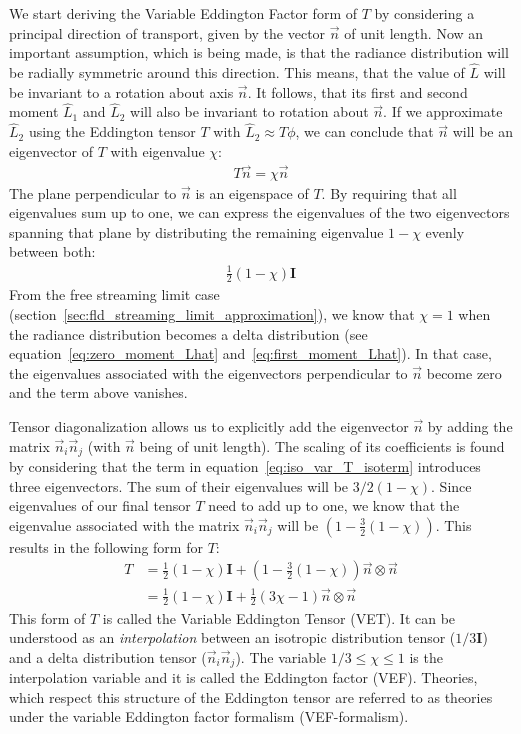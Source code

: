 We start deriving the Variable Eddington Factor form of $T$ by considering a principal direction of transport, given by the vector $\vec{n}$ of unit length. Now an important assumption, which is being made, is that the radiance distribution will be radially symmetric around this direction. This means, that the value of $\hat{L}$ will be invariant to a rotation about axis $\vec{n}$. It follows, that its first and second moment $\hat{L}_1$ and $\hat{L}_2$ will also be invariant to rotation about $\vec{n}$. If we approximate $\hat{L}_2$ using the Eddington tensor $T$ with $\hat{L}_2\approx T\phi$, we can conclude that $\vec{n}$ will be an eigenvector of $T$ with eigenvalue $\chi$:
\begin{align*}
T\vec{n} = \chi\vec{n}
\end{align*}
The plane perpendicular to $\vec{n}$ is an eigenspace of $T$. By requiring that all eigenvalues sum up to one, we can express the eigenvalues of the two eigenvectors spanning that plane by distributing the remaining eigenvalue $1-\chi$ evenly between both:
\begin{align}
\frac{1}{2}\left(1-\chi\right)\mathbf{I}
\label{eq:iso_var_T_isoterm}
\end{align}
From the free streaming limit case (section~\ref{sec:fld_streaming_limit_approximation}), we know that $\chi=1$ when the radiance distribution becomes a delta distribution (see equation~\ref{eq:zero_moment_Lhat} and~\ref{eq:first_moment_Lhat}). In that case, the eigenvalues associated with the eigenvectors perpendicular to $\vec{n}$ become zero and the term above vanishes.

Tensor diagonalization allows us to explicitly add the eigenvector $\vec{n}$ by adding the matrix $\vec{n}_i\vec{n}_j$ (with $\vec{n}$ being of unit length). The scaling of its coefficients is found by considering that the term in equation~\ref{eq:iso_var_T_isoterm} introduces three eigenvectors. The sum of their eigenvalues will be $3/2(1-\chi)$. Since eigenvalues of our final tensor $T$ need to add up to one, we know that the eigenvalue associated with the matrix $\vec{n}_i\vec{n}_j$ will be $\left(1- \frac{3}{2}\left(1 - \chi\right)\right)$. This results in the following form for $T$:
\begin{align}
T &= \frac{1}{2}\left(1-\chi\right)\mathbf{I} + \left(1- \frac{3}{2}\left(1 - \chi\right)\right) \vec{n}\otimes\vec{n}
\nonumber
\\
&= \frac{1}{2}\left(1-\chi\right)\mathbf{I} + \frac{1}{2}\left(3\chi-1\right) \vec{n}\otimes\vec{n}
\label{eq:iso_var_T}
\end{align}
This form of $T$ is called the Variable Eddington Tensor (VET). It can be understood as an \emph{interpolation} between an isotropic distribution tensor ($1/3\mathbf{I}$) and a delta distribution tensor ($\vec{n}_i\vec{n}_j$). The variable $1/3 \le \chi \le 1$ is the interpolation variable and it is called the Eddington factor (VEF). Theories, which respect this structure of the Eddington tensor are referred to as theories under the variable Eddington factor formalism (VEF-formalism).

